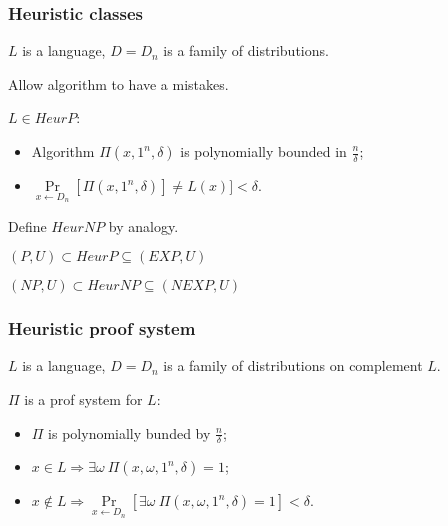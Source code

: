 \begin{frame}
    \frametitle{Heuristic classes}

    $L$ is a language, $D = {D_n}$ is a family of distributions.

    Allow algorithm to have a mistakes.

    \pause
    \begin{definition}
        $L \in HeurP$:
        \begin{itemize}
            \item Algorithm $\Pi(x, 1^n, \delta)$ is polynomially bounded in $\frac{n}{\delta}$;
            \item $\Pr\limits_{x \gets D_n}[\Pi(x, 1^n, \delta)] \neq
        		L(x)] < \delta$.
        \end{itemize}
    \end{definition}

    Define $HeurNP$ by analogy.

    \pause

    \vspace{0.5cm}
    $(P, U) \subset HeurP \subseteq (EXP, U)$
    
    $(NP, U) \subset HeurNP \subseteq (NEXP, U)$
\end{frame}

\begin{frame}
    \frametitle{Heuristic proof system}

    $L$ is a language, $D = {D_n}$ is a family of distributions on
    complement $L$.

    \pause
    \begin{definition}
        $\Pi$ is a prof system for $L$:
        \begin{itemize}
            \item $\Pi$ is polynomially bunded by $\frac{n}{\delta}$;
            \item $x \in L \Rightarrow \exists \omega~\Pi(x, \omega,
        		1^n, \delta) = 1$;
            \item $x \notin L \Rightarrow
        		\Pr\limits_{x \gets D_n}[\exists \omega~
                \Pi(x, \omega, 1^n, \delta) = 1] < \delta$.
        \end{itemize}
    \end{definition}
    
\end{frame}

